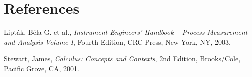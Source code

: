 \filbreak
\section*{References}


\noindent
Lipt\'ak, B\'ela G. et al., \textit{Instrument Engineers' Handbook -- Process Measurement and Analysis Volume I}, Fourth Edition, CRC Press, New York, NY, 2003.

\vskip 10pt

\noindent
Stewart, James, \textit{Calculus: Concepts and Contexts}, 2nd Edition, Brooks/Cole, Pacific Grove, CA, 2001.
















%
